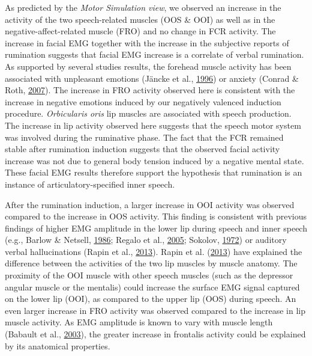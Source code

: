 \documentclass[a4paper,12pt,twoside,onecolumn,openright,final,oldfontcommands]{memoir}
\begin{document}
As predicted by the \emph{Motor Simulation view}, we observed an increase in the activity of the two speech-related muscles (OOS \& OOI) as well as in the negative-affect-related muscle (FRO) and no change in FCR activity. The increase in facial EMG together with the increase in the subjective reports of rumination suggests that facial EMG increase is a correlate of verbal rumination. As supported by several studies results, the forehead muscle activity has been associated with unpleasant emotions (Jäncke et al., \protect\hyperlink{ref-Jancke1996}{1996}) or anxiety (Conrad \& Roth, \protect\hyperlink{ref-conrad_muscle_2007}{2007}). The increase in FRO activity observed here is consistent with the increase in negative emotions induced by our negatively valenced induction procedure. \emph{Orbicularis oris} lip muscles are associated with speech production. The increase in lip activity observed here suggests that the speech motor system was involved during the ruminative phase. The fact that the FCR remained stable after rumination induction suggests that the observed facial activity increase was not due to general body tension induced by a negative mental state. These facial EMG results therefore support the hypothesis that rumination is an instance of articulatory-specified inner speech.

After the rumination induction, a larger increase in OOI activity was observed compared to the increase in OOS activity. This finding is consistent with previous findings of higher EMG amplitude in the lower lip during speech and inner speech (e.g., Barlow \& Netsell, \protect\hyperlink{ref-barlow_differential_1986}{1986}; Regalo et al., \protect\hyperlink{ref-regalo_electromyographic_2005}{2005}; Sokolov, \protect\hyperlink{ref-sokolov_inner_1972}{1972}) or auditory verbal hallucinations (Rapin et al., \protect\hyperlink{ref-Rapin2013}{2013}). Rapin et al. (\protect\hyperlink{ref-Rapin2013}{2013}) have explained the difference between the activities of the two lip muscles by muscle anatomy. The proximity of the OOI muscle with other speech muscles (such as the depressor angular muscle or the mentalis) could increase the surface EMG signal captured on the lower lip (OOI), as compared to the upper lip (OOS) during speech. An even larger increase in FRO activity was observed compared to the increase in lip muscle activity. As EMG amplitude is known to vary with muscle length (Babault et al., \protect\hyperlink{ref-babault_effect_2003}{2003}), the greater increase in frontalis activity could be explained by its anatomical properties.
\end{document}
